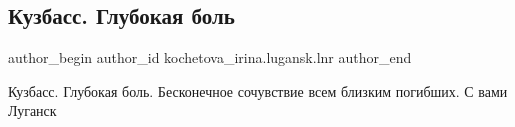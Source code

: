  
 
 
 
 
 
\subsection{Кузбасс. Глубокая боль}
\label{sec:25_11_2021.fb.kochetova_irina.lugansk.lnr.2.kuzbass}
 
\ifcmt
 author_begin
   author_id kochetova_irina.lugansk.lnr
 author_end
\fi

Кузбасс.
Глубокая боль.
Бесконечное сочувствие всем близким погибших.
С вами Луганск
